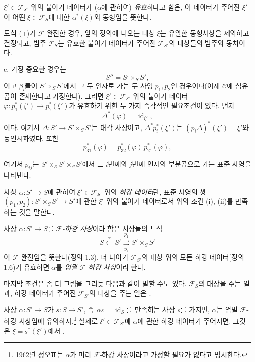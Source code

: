  $\xi'\in\mathcal F_{S'}$ 위의 붙이기 데이터가
($\alpha$에 관하여) \emph{유효}하다고 함은, 이 데이터가 주어진 $\xi'$이
어떤 $\xi\in\mathcal F_S$에 대한 $\alpha^*(\xi)$와 동형임을
뜻한다.

도식 (+)가 $\mathcal F$-완전한 경우, 앞의 정의에 나오는 대상 $\xi$는
유일한 동형사상을 제외하고 결정되고, 범주 $\mathcal F_S$는
유효한 붙이기 데이터가 주어진 $\mathcal F_{S'}$의 대상들의 범주와
동치이다.

\medskip\noindent
c. 가장 중요한 경우는
\[
  S''=S'\times_S S',
\]
이고 $\beta_i$들이 $S'\times_S S'$에서 그 두 인자로 가는 두 사영
$p_1,p_2$인 경우이다(이제 $\mathcal C$에 섬유곱이 존재한다고 가정한다).
그러면 $\xi'\in\mathcal F_{S'}$ 위의 붙이기 데이터
$\varphi:p_1^*(\xi')\longrightarrow p_2^*(\xi')$가 유효하기 위한
두 가지 즉각적인 필요조건이 있다. 먼저
\[
  \tag{i}
  \Delta^*(\varphi)=\operatorname{id}_{\xi'},
\]
이다. 여기서 $\Delta:S'\longrightarrow S'\times_S S'$는 대각 사상이고,
$\Delta^*p_i^*(\xi')$는 $(p_i\Delta)^*(\xi')=\xi'$와
동일시하였다. 또한
\[
  \tag{ii}
  p_{31}^*(\varphi)=p_{32}^*(\varphi)\,p_{21}^*(\varphi),
\]

여기서 $p_{ij}$는 $S'\times_S S'\times_S S'$에서 그 $i$번째와
$j$번째 인자의 부분곱으로 가는 표준 사영을 나타낸다.

 사상 $\alpha:S'\longrightarrow S$에 관하여
$\xi'\in\mathcal F_{S'}$ 위의 \emph{하강 데이터}란, 표준 사영의 쌍
$(p_1,p_2):S'\times_S S'\longrightarrow S'$에 관한 $\xi'$ 위의
붙이기 데이터로서 위의 조건 (i), (ii)를 만족하는 것을 말한다.

 사상 $\alpha:S'\longrightarrow S$를
\emph{$\mathcal F$-하강 사상}이라 함은 사상들의 도식
\[
  S\xleftarrow{\alpha}S'
  \overset{p_1}{\underset{p_2}{\rightrightarrows}}S'\times_S S'
\]
이 $\mathcal F$-완전임을 뜻한다(정의 1.3). 더 나아가
$\mathcal F_{S'}$의 대상 위의 모든 하강 데이터(정의 1.6)가 유효하면
$\alpha$를 \emph{엄밀 $\mathcal F$-하강 사상}이라 한다.

마지막 조건은 좀 더 그림을 그리듯 다음과 같이 말할 수도 있다.
$\mathcal F_S$의 대상을 주는 일과, 하강 데이터가 주어진
$\mathcal F_{S'}$의 대상을 주는 일은 .

사상 $\alpha:S'\longrightarrow S$가 
$s:S\longrightarrow S'$, 즉 $\alpha s=\operatorname{id}_S$를 만족하는
사상 $s$를 가지면, $\alpha$는 엄밀 $\mathcal F$-하강 사상임에
유의하자.\footnote{1962년 정오표는 $\alpha$가 미리
$\mathcal F$-하강 사상이라고 가정할 필요가 없다고 명시한다.}
실제로 $\xi'\in\mathcal F_{S'}$에 $\alpha$에 관한 하강 데이터가 주어지면,
그것은 $\xi=s^*(\xi')$에서 .

